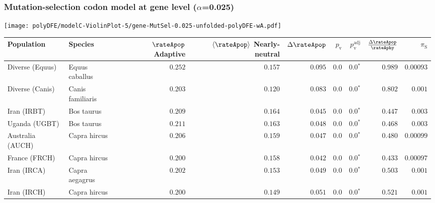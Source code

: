 \subsubsection*{Mutation-selection codon model at gene level ($\alpha$=0.025)}
\begin{center}
    \texttt{[image: polyDFE/modelC-ViolinPlot-5/gene-MutSel-0.025-unfolded-polyDFE-wA.pdf]}
    \begin{adjustbox}{width = 1\textwidth}
        \begin{tabular}{|l|l|r|r|r|r|r|r|r|}
            \toprule
            Population & Species & \specialcell{$\rateApop$ \\ Adaptive}                & \specialcell{$\left< \rateApop \right>$ \\ Nearly-neutral}                & $\Delta \rateApop $    & $p_{\mathrm{v}}$ & $p_{\mathrm{v}}^{\mathrm{adj}}$ & $\frac{\Delta\rateApop}{\rateAphy}$ & $\pi_{\textrm{S}}$ \\
            \midrule
            Diverse (Equus)                    & Equus caballus          & $ 0.252$ & $ 0.157$ & $ 0.095$ & $0.0$ & $\bm{0.0{^*}}$ & $ 0.989$ & $0.00093$  \\
            Diverse (Canis)                  & Canis familiaris          & $ 0.203$ & $ 0.120$ & $ 0.083$ & $0.0$ & $\bm{0.0{^*}}$ & $ 0.802$ & $ 0.001$ \\
            Iran (IRBT)               & Bos taurus        & $ 0.209$ & $ 0.164$ & $ 0.045$ & $0.0$ & $\bm{0.0{^*}}$ & $ 0.447$ & $ 0.003$ \\
            Uganda (UGBT)                  & Bos taurus        & $ 0.211$ & $ 0.163$ & $ 0.048$ & $0.0$ & $\bm{0.0{^*}}$ & $ 0.468$ & $ 0.003$ \\
            Australia (AUCH)                    & Capra hircus      & $ 0.206$ & $ 0.159$ & $ 0.047$ & $0.0$ & $\bm{0.0{^*}}$ & $ 0.480$ & $0.00099$ \\
            France (FRCH)                    & Capra hircus        & $ 0.200$ & $ 0.158$ & $ 0.042$ & $0.0$ & $\bm{0.0{^*}}$ & $ 0.433$ & $0.00097$ \\
            Iran (IRCA)                   & Capra aegagrus        & $ 0.202$ & $ 0.153$ & $ 0.049$ & $0.0$ & $\bm{0.0{^*}}$ & $ 0.503$ & $ 0.001$ \\
            Iran (IRCH)                 & Capra hircus        & $ 0.200$ & $ 0.149$ & $ 0.051$ & $0.0$ & $\bm{0.0{^*}}$ & $ 0.521$ & $ 0.001$ \\

\end{tabular}
\end{adjustbox}
\end{center}
